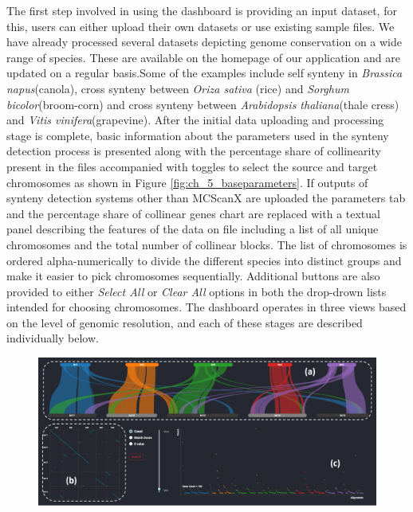 The first step involved in using the dashboard is providing an input dataset, for this, users can either upload their own datasets or use existing sample files. We have already processed several datasets depicting genome conservation on a wide range of species. These are available on the homepage of our application and are updated on a regular basis.Some of the examples include self synteny in \textit{Brassica napus}(canola), cross synteny between \textit{Oriza sativa} (rice) and \textit{Sorghum bicolor}(broom-corn) and cross synteny between \textit{Arabidopsis thaliana}(thale cress) and \textit{Vitis vinifera}(grapevine). After the initial data uploading and processing stage is complete, basic information about the parameters used in the synteny detection process is presented along with the percentage share of collinearity present in the files accompanied with toggles to select the source and target chromosomes as shown in Figure \ref{fig:ch_5_baseparameters}. If outputs of synteny detection systems other than MCScanX are uploaded the parameters tab and the percentage share of collinear genes chart are replaced with a textual panel describing the features of the data on file including a list of all unique chromosomes and the total number of collinear blocks. The list of chromosomes is ordered alpha-numerically to divide the different species into distinct groups and make it easier to pick chromosomes sequentially. Additional buttons are also provided to either \textit{Select All} or \textit{Clear All} options in both the drop-drown lists intended for choosing chromosomes. The dashboard operates in three views based on the level of genomic resolution, and each of these stages are described individually below.

\begin{figure}
  \centering
  \includegraphics[width=1\linewidth]{images/ch_1_dashboard.PNG}
  \label{fig:ch_4_dashboard}
\end{figure} 

